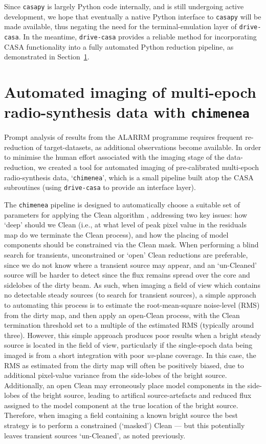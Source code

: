 \documentclass[5p,authoryear]{elsarticle}
\begin{document}
Since \texttt{casapy} is largely Python code internally, and is still undergoing active development, we hope that eventually a native Python interface to \texttt{casapy} will be made available, thus negating the need for the terminal-emulation layer of \texttt{drive-casa}. 
In the meantime, \texttt{drive-casa} provides a reliable method for incorporating CASA functionality into a fully automated Python reduction pipeline, as demonstrated in Section~\ref{sec:chimenea}.



\section{Automated imaging of multi-epoch radio-synthesis data with \texttt{chimenea}}
\label{sec:chimenea}
Prompt analysis of results from the ALARRM programme requires frequent re-reduction of target-datasets, as additional observations become available.
In order to minimise the human effort associated with the imaging stage of the data-reduction, we created a tool for automated imaging of pre-calibrated multi-epoch radio-synthesis data, `\texttt{chimenea}', which is a small pipeline built atop the CASA subroutines (using \texttt{drive-casa} to provide an interface layer). 

The \texttt{chimenea} pipeline is designed to automatically choose a suitable set of parameters for applying the Clean algorithm \citep{Hogbom1974,Schwab1984}, addressing two key issues: how `deep' should we Clean (i.e., at what level of peak pixel value in the residuals map do we terminate the Clean process), and how the placing of model components should be constrained via the Clean mask. 
When performing a blind search for transients, unconstrained or `open' Clean reductions are preferable, since we do not know where a transient source may appear, and an `un-Cleaned' source will be harder to detect since the flux remains spread over the core and sidelobes of the dirty beam. 
As such, when imaging a field of view which contains no detectable steady sources (to search for transient sources), a simple approach to automating this process is to estimate the root-mean-square noise-level (RMS) from the dirty map, and then apply an open-Clean process, with the Clean termination threshold set to a multiple of the estimated RMS (typically around three). 
However, this simple approach produces poor results when a bright steady source is located in the field of view, particularly if the single-epoch data being imaged is from a short integration with poor \textit{uv}-plane coverage.
In this case, the RMS as estimated from the dirty map will often be positively biased, due to additional pixel-value variance from the side-lobes of the bright source. 
Additionally, an open Clean may erroneously place model components in the side-lobes of the bright source, leading to artifical source-artefacts and reduced flux assigned to the model component at the true location of the bright source.
Therefore, when imaging a field containing a known bright source the best strategy is to perform a constrained (`masked') Clean --- but this potentially leaves transient sources `un-Cleaned', as noted previously.
\end{document}
